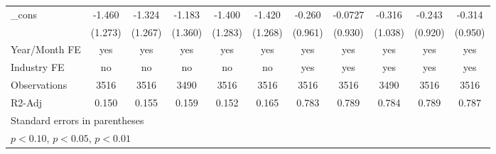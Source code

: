 \begin{table}[htbp]
\begin{tabular}{l*{10}{c}}
\_cons          &   -1.460         &   -1.324         &   -1.183         &   -1.400         &   -1.420         &   -0.260         &  -0.0727         &   -0.316         &   -0.243         &   -0.314         \\
                &  (1.273)         &  (1.267)         &  (1.360)         &  (1.283)         &  (1.268)         &  (0.961)         &  (0.930)         &  (1.038)         &  (0.920)         &  (0.950)         \\
\hline
Year/Month FE   &      yes         &      yes         &      yes         &      yes         &      yes         &      yes         &      yes         &      yes         &      yes         &      yes         \\
Industry FE     &       no         &       no         &       no         &       no         &       no         &      yes         &      yes         &      yes         &      yes         &      yes         \\
Observations    &     3516         &     3516         &     3490         &     3516         &     3516         &     3516         &     3516         &     3490         &     3516         &     3516         \\
R2-Adj          &    0.150         &    0.155         &    0.159         &    0.152         &    0.165         &    0.783         &    0.789         &    0.784         &    0.789         &    0.787         \\
\hline\hline
\multicolumn{11}{l}{\footnotesize Standard errors in parentheses}\\
\multicolumn{11}{l}{\footnotesize \sym{*} \(p<0.10\), \sym{**} \(p<0.05\), \sym{***} \(p<0.01\)}\\
\end{tabular}
\end{table}
